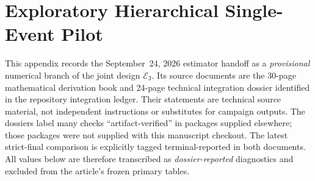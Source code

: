 \section{Exploratory Hierarchical Single-Event Pilot}
\label{app:single-event-pilot}

This appendix records the September~24, 2026 estimator handoff as a \emph{provisional} numerical branch of the joint design $\mathcal E_{\mathrm J}$. Its source documents are the 30-page mathematical derivation book and 24-page technical integration dossier identified in the repository integration ledger. Their statements are technical source material, not independent instructions or substitutes for campaign outputs. The dossiers label many checks ``artifact-verified'' in packages supplied elsewhere; those packages were not supplied with this manuscript checkout. The latest strict-final comparison is explicitly tagged terminal-reported in both documents. All values below are therefore transcribed as \emph{dossier-reported} diagnostics and excluded from the article's frozen primary tables.

